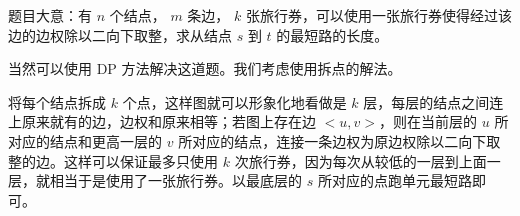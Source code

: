 题目大意：有 $n$ 个结点， $m$ 条边， $k$ 张旅行券，可以使用一张旅行券使得经过该边的边权除以二向下取整，求从结点 $s$ 到 $t$ 的最短路的长度。

当然可以使用 DP 方法解决这道题。我们考虑使用拆点的解法。

将每个结点拆成 $k$ 个点，这样图就可以形象化地看做是 $k$ 层，每层的结点之间连上原来就有的边，边权和原来相等；若图上存在边 $<u,v>$，则在当前层的 $u$ 所对应的结点和更高一层的 $v$ 所对应的结点，连接一条边权为原边权除以二向下取整的边。这样可以保证最多只使用 $k$ 次旅行券，因为每次从较低的一层到上面一层，就相当于是使用了一张旅行券。以最底层的 $s$ 所对应的点跑单元最短路即可。
